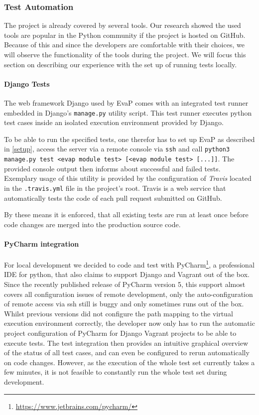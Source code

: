 \subsubsection{Test Automation}
The project is already covered by several tools.
Our research showed the used tools are popular in the Python community if the project is hosted on GitHub.
Because of this and since the developers are comfortable with their choices, we will observe the functionality of the tools during the project.
We will focus this section on describing our experience with the set up of running tests locally.

\paragraph{Django Tests}
The web framework Django used by EvaP comes with an integrated test runner embedded in Django's \texttt{manage.py} utility script.
This test runner executes python test cases inside an isolated execution environment provided by Django.

To be able to run the specified tests, one therefor has to set up EvaP as described in \autoref{setup}, access the server via a remote console via \texttt{ssh} and call \texttt{python3 manage.py test <evap module test> [<evap module test> [...]]}.
The provided console output then informs about successful and failed tests.
Exemplary usage of this utility is provided by the configuration of \textit{Travis} located in the \texttt{.travis.yml} file in the project's root.
Travis is a web service that automatically tests the code of each pull request submitted on GitHub.

By these means it is enforced, that all existing tests are run at least once before code changes are merged into the production source code.

\paragraph{PyCharm integration}
For local development we decided to code and test with PyCharm\footnote{\url{https://www.jetbrains.com/pycharm/}}, a professional IDE for python, that also claims to support Django and Vagrant out of the box.
Since the recently published release of PyCharm version 5, this support almost covers all configuration issues of remote development, only the auto-configuration of remote access via ssh still is buggy and only sometimes runs out of the box.
Whilst previous versions did not configure the path mapping to the virtual execution environment correctly, the developer now only has to run the automatic project configuration of PyCharm for Django Vagrant projects to be able to execute tests.
The test integration then provides an intuitive graphical overview of the status of all test cases, and can even be configured to rerun automatically on code changes.
However, as the execution of the whole test set currently takes a few minutes, it is not feasible to constantly run the whole test set during development.

